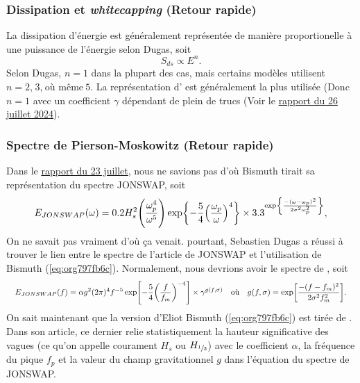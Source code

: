 \documentclass[10pt]{article}
\numberwithin{equation}{section}
\newcommand{\pt}{\hspace{1pt}} %
\begin{document}
\subsubsection{Dissipation et \emph{whitecapping} (Retour rapide)}
\label{sec:orgce77660}
La dissipation d'énergie est généralement représentée de manière proportionelle à une puissance de l'énergie selon Dugas, soit
\begin{equation}
   S_{ds} \propto E^n.
\end{equation}
Selon Dugas, \(n=1\) dans la plupart des cas, mais certains modèles utilisent \(n =2,\pt 3,\pt\text{où même}\ 5\).
La représentation d'\Textcite{hasselmann1974spectral} est généralement la plus utilisée (Donc \(n=1\) avec un coefficient \(\gamma\) dépendant de plein de trucs (Voir le \href{Fichiers\_pdf/rapport-2024-07-26.pdf}{rapport du 26 juillet 2024}).
\subsubsection{Spectre de Pierson-Moskowitz (Retour rapide)}
\label{sec:orgb65fff7}
Dans le \href{rapport-2024-08-23.pdf}{rapport du 23 juillet}, nous ne savions pas d'où Bismuth tirait sa représentation du spectre JONSWAP, soit
\begin{equation}
\label{eq:org797fb6c}
   E_{JONSWAP}(\omega) = 0.2H_s^2 \qty(\frac{\omega_p^4}{\omega^5}) \exp{-\frac{5}{4}\qty(\frac{\omega_p}{\omega})^4} \times 3.3^{\exp{\frac{-(\omega-\omega_p)^2}{2\sigma^2 \omega_p^2}}},
\end{equation}
On ne savait pas vraiment d'où ça venait.
pourtant, Sebastien Dugas a réussi à trouver le lien entre le spectre de l'article de JONSWAP et l'utilisation de Bismuth (\ref{eq:org797fb6c}).
Normalement, nous devrions avoir le spectre de \Textcite{hasselmann1973measurements}, soit
\begin{align}
   && E_{JONSWAP}(f) = \alpha g^2 (2\pi)^4 f^{-5} \exp[- \frac{5}{4} \qty(\frac{f}{f_m})^{-4}]\times \gamma^{g(f,\sigma)}
   && \text{où}
   && g(f,\sigma) = \exp[ \frac{-(f-f_m)^2}{2\sigma^2f_m^2}]. &&
\end{align}
On sait maintenant que la version d'Eliot Bismuth (\ref{eq:org797fb6c}) est tirée de \Textcite[, à l'équation 11 de l'article]{goda1988variablity}.
Dans son article, ce dernier relie statistiquement la hauteur significative des vagues (ce qu'on appelle courament \(H_s\) ou \(H_{\sfrac{1}{3}}\)) avec le coefficient \(\alpha\), la fréquence du pique \(f_p\) et la valeur du champ gravitationnel \(g\) dans l'équation du spectre de JONSWAP.
\end{document}
